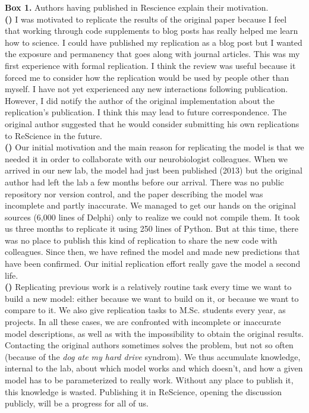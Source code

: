 \documentclass[a4paper,10pt, twocolumn]{article}
\begin{document}
\begin{tcolorbox}[breakable, pad at break*=1mm,
                  colback=black!2.5, arc=0pt, outer arc=0pt, boxrule=.25pt]
\begin{footnotesize}
\textbf{Box 1.} Authors having  published in Rescience explain their motivation.\\

\textbf{(\cite{stachelek:2016})} I was motivated to replicate the results of
the original paper because I feel that working through code supplements to blog
posts has really helped me learn how to science. I could have published my
replication as a blog post but I wanted the exposure and permanency that goes
along with journal articles. This was my first experience with formal
replication. I think the review was useful because it forced me to consider how
the replication would be used by people other than myself. I have not yet
experienced any new interactions following publication. However, I did notify
the author of the original implementation about the replication's
publication. I think this may lead to future correspondence. The original
author suggested that he would consider submitting his own replications to
ReScience in the future.\\

\textbf{(\cite{topalidou:2015b})} Our initial motivation and the main reason
for replicating the model is that we needed it in order to collaborate with our
neurobiologist colleagues. When we arrived in our new lab, the model had just
been published (2013) but the original author had left the lab a few months before
our arrival. There was no public repository nor version control, and the paper
describing the model was incomplete and partly inaccurate. We managed to get
our hands on the original sources (6,000 lines of Delphi) only to realize we
could not compile them. It took us three months to replicate it using 250 lines
of Python. But at this time, there was no place to publish this kind of
replication to share the new code with colleagues. Since then, we have refined
the model and made new predictions that have been confirmed. Our initial
replication effort really gave the model a second life.\\

\textbf{(\cite{viejo:2016})} Replicating previous work is a relatively routine
task every time we want to build a new model: either because we want to build
on it, or because we want to compare to it. We also give replication tasks to
M.Sc. students every year, as projects. In all these cases, we are confronted
with incomplete or inaccurate model descriptions, as well as with the impossibility
to obtain the original results. Contacting the original authors sometimes
solves the problem, but not so often (because of the {\em dog ate my hard
  drive} syndrom). We thus accumulate knowledge, internal to the lab, about
which model works and which doesn't, and how a given model has to be parameterized
to really work. Without any place to publish it, this knowledge is
wasted. Publishing it in ReScience, opening the discussion publicly, will be a
progress for all of us. \par
\end{footnotesize}
\end{tcolorbox}
\end{document}
